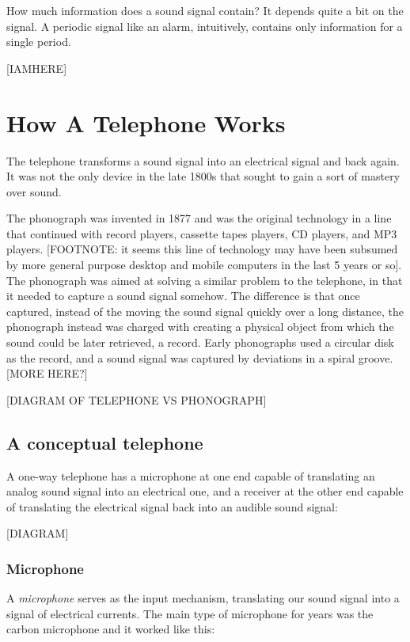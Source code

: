 \documentclass[UTF8]{book}
\begin{document}
\begin{CJK}{UTF8}{gbsn}
How much information does a sound signal contain? It depends quite a bit on the signal. A periodic signal like an alarm, intuitively, contains only information for a single period.

[IAMHERE]

\chapter{How A Telephone Works}

The telephone transforms a sound signal into an electrical signal and back again. It was not the only device in the late 1800s that sought to gain a sort of mastery over sound.

The phonograph was invented in 1877 and was the original technology in a line that continued with record players, cassette tapes players, CD players, and MP3 players. [FOOTNOTE: it seems this line of technology may have been subsumed by more general purpose desktop and mobile computers in the last 5 years or so]. The phonograph was aimed at solving a similar problem to the telephone, in that it needed to capture a sound signal somehow. The difference is that once captured, instead of the moving the sound signal quickly over a long distance, the phonograph instead was charged with creating a physical object from which the sound could be later retrieved, a record. Early phonographs used a circular disk as the record, and a sound signal was captured by deviations in a spiral groove. [MORE HERE?]

[DIAGRAM OF TELEPHONE VS PHONOGRAPH]

\section{A conceptual telephone}

A one-way telephone has a microphone at one end capable of translating an analog sound signal into an electrical one, and a receiver at the other end capable of translating the electrical signal back into an audible sound signal:

[DIAGRAM]

\subsection{Microphone}

A \emph{microphone} serves as the input mechanism, translating our sound signal into a signal of electrical currents. The main type of microphone for years was the carbon microphone and it worked like this:


\end{CJK}
\end{document}
